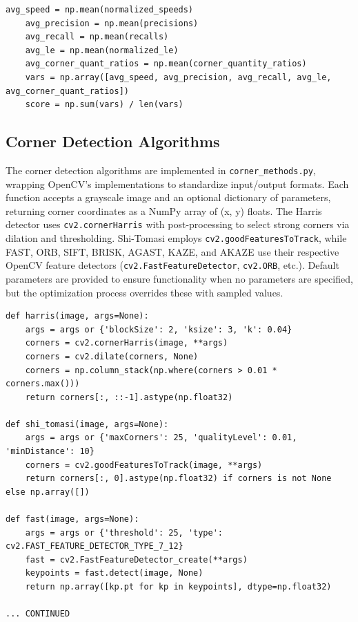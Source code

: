 \documentclass[journal]{IEEEtran}
\begin{document}
\begin{lstlisting}[style=python, caption={Best Combination Scoring}, label={lst:scoring}]
    avg_speed = np.mean(normalized_speeds)
    avg_precision = np.mean(precisions)
    avg_recall = np.mean(recalls)
    avg_le = np.mean(normalized_le)
    avg_corner_quant_ratios = np.mean(corner_quantity_ratios)
    vars = np.array([avg_speed, avg_precision, avg_recall, avg_le, avg_corner_quant_ratios])
    score = np.sum(vars) / len(vars)
\end{lstlisting}

\subsection{Corner Detection Algorithms}
The corner detection algorithms are implemented in \texttt{corner\_methods.py}, wrapping OpenCV’s implementations to standardize input/output formats. Each function accepts a grayscale image and an optional dictionary of parameters, returning corner coordinates as a NumPy array of (x, y) floats. The Harris detector uses \texttt{cv2.cornerHarris} with post-processing to select strong corners via dilation and thresholding. Shi-Tomasi employs \texttt{cv2.goodFeaturesToTrack}, while FAST, ORB, SIFT, BRISK, AGAST, KAZE, and AKAZE use their respective OpenCV feature detectors (\texttt{cv2.FastFeatureDetector}, \texttt{cv2.ORB}, etc.). Default parameters are provided to ensure functionality when no parameters are specified, but the optimization process overrides these with sampled values.\\


\begin{lstlisting}[style=python, caption={Corner Detection Wrapper Implementations}, label={lst:corern_methods}]
def harris(image, args=None):
    args = args or {'blockSize': 2, 'ksize': 3, 'k': 0.04}
    corners = cv2.cornerHarris(image, **args)
    corners = cv2.dilate(corners, None)
    corners = np.column_stack(np.where(corners > 0.01 * corners.max()))
    return corners[:, ::-1].astype(np.float32)

def shi_tomasi(image, args=None):
    args = args or {'maxCorners': 25, 'qualityLevel': 0.01, 'minDistance': 10}
    corners = cv2.goodFeaturesToTrack(image, **args)
    return corners[:, 0].astype(np.float32) if corners is not None else np.array([])

def fast(image, args=None):
    args = args or {'threshold': 25, 'type': cv2.FAST_FEATURE_DETECTOR_TYPE_7_12}
    fast = cv2.FastFeatureDetector_create(**args)
    keypoints = fast.detect(image, None)
    return np.array([kp.pt for kp in keypoints], dtype=np.float32)

... CONTINUED
\end{lstlisting}
\end{document}
